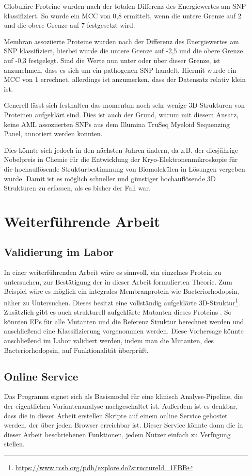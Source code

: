 Globuläre Proteine wurden nach der totalen Differenz des Energiewertes am \ac{SNP} klassifiziert. So wurde ein MCC von 0,8 ermittelt, wenn die untere Grenze auf 2 und die obere Grenze auf 7 festgesetzt wird. 

Membran assoziierte Proteine wurden nach der Differenz des Energiewertes am \ac{SNP} klassifiziert, hierbei wurde die untere Grenze auf -2,5 und die obere Grenze auf -0,3 festgelegt. Sind die Werte nun unter oder über dieser Grenze, ist anzunehmen, dass es sich um ein pathogenen \ac{SNP} handelt. Hiermit wurde ein MCC von 1 errechnet, allerdings ist anzumerken, dass der Datensatz relativ klein ist.

Generell lässt sich festhalten das momentan noch sehr wenige 3D Strukturen von Proteinen aufgeklärt sind. Dies ist auch der Grund, warum mit diesem Ansatz, keine \ac{AML} assoziierten \ac{SNP}s aus dem Illumina TruSeq Myeloid Sequenzing Panel, annotiert werden konnten.

Dies könnte sich jedoch in den nächsten Jahren ändern, da z.B. der diesjährige Nobelpreis in Chemie für die Entwicklung der Kryo-Elektro\-nen\-mi\-kros\-ko\-pie für die hochauflösende Strukturbestimmung von Biomolekülen in Lösungen vergeben wurde. Damit ist es möglich schneller und günstiger hochauflösende 3D Strukturen zu erfassen, als es bisher der Fall war.



\section{Weiterführende Arbeit}

\subsection{Validierung im Labor}
In einer weiterführenden Arbeit wäre es sinnvoll, ein einzelnes Protein zu untersuchen, zur Bestätigung der in dieser Arbeit formulierten Theorie. Zum Beispiel wäre es möglich ein integrales Membranprotein wie Bacteriorhodopsin, näher zu Untersuchen. Dieses besitzt eine vollständig aufgeklärte 3D-Struktur\footnote{\url{https://www.rcsb.org/pdb/explore.do?structureId=1FBB}}. Zusätzlich gibt es auch strukturell aufgeklärte Mutanten dieses Proteins \cite{Vonck.2000}. So könnten \ac{EP}s für alle Mutanten und die Referenz Struktur berechnet werden und anschließend eine Klassifizierung vorgenommen werden. Diese Vorhersage könnte anschließend im Labor validiert werden, indem man die Mutanten, des Bacteriorhodopsin, auf Funktionalität überprüft.


\subsection{Online Service}
Das Programm eignet sich als Basismodul für eine klinisch Analyse-Pipeline, die der eigentlichen Variantenanalyse nachgeschaltet ist. Außerdem ist es denkbar, dass die in dieser Arbeit erstellen Skripte auf einem online Service gehostet werden, der über jeden Browser erreichbar ist. Dieser Service könnte dann die in dieser Arbeit beschriebenen Funktionen, jedem Nutzer einfach zu Verfügung stellen. %